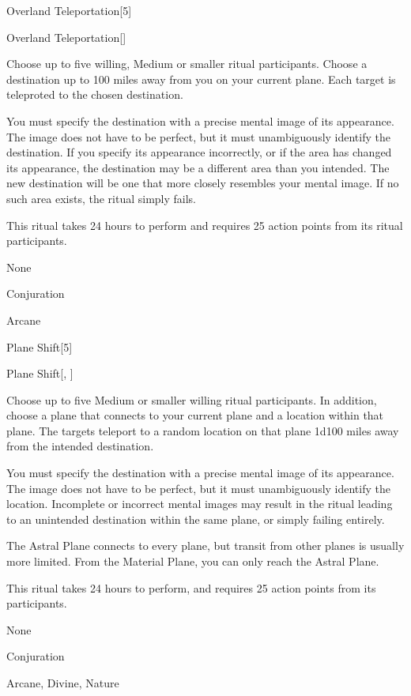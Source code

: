 \begin{spellsection}{Overland Teleportation}[5]


\begin{ability}{Overland Teleportation}[]

Choose up to five willing, Medium or smaller ritual participants.
Choose a destination up to 100 miles away from you on your current plane.
Each target is teleproted to the chosen destination.

You must specify the destination with a precise mental image of its appearance.
The image does not have to be perfect, but it must unambiguously identify the destination.
If you specify its appearance incorrectly, or if the area has changed its appearance, the destination may be a different area than you intended.
The new destination will be one that more closely resembles your mental image.
If no such area exists, the ritual simply fails.

This ritual takes 24 hours to perform and requires 25 action points from its ritual participants.

\end{ability}


 None

 Conjuration

 Arcane
\end{spellsection}


\begin{spellsection}{Plane Shift}[5]


\begin{ability}{Plane Shift}[, ]

Choose up to five Medium or smaller willing ritual participants.
In addition, choose a plane that connects to your current plane and a location within that plane.
The targets teleport to a random location on that plane 1d100 miles away from the intended destination.

You must specify the destination with a precise mental image of its appearance.
The image does not have to be perfect, but it must unambiguously identify the location.
Incomplete or incorrect mental images may result in the ritual leading to an unintended destination within the same plane, or simply failing entirely.

The Astral Plane connects to every plane, but transit from other planes is usually more limited.
From the Material Plane, you can only reach the Astral Plane.

This ritual takes 24 hours to perform, and requires 25 action points from its participants.

\end{ability}


 None

 Conjuration

 Arcane, Divine, Nature
\end{spellsection}


